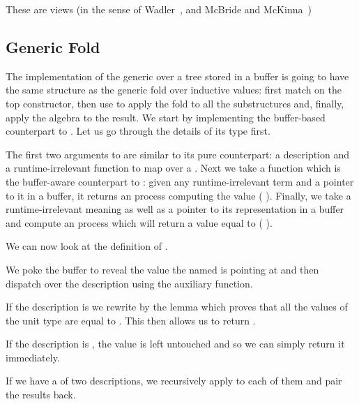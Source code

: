 These are views
(in the sense of Wadler~\cite{DBLP:conf/popl/Wadler87},
and McBride and McKinna~\cite{DBLP:journals/jfp/McBrideM04})


\subsection{Generic Fold}

The implementation of the generic  over a tree stored
in a buffer is going to have the same structure as the generic fold over
inductive values: first match on the top constructor, then use 
to apply the fold to all the substructures and, finally, apply the algebra to
the result.
%
We start by implementing the buffer-based counterpart to .
Let us go through the details of its type first.


The first two arguments to  are similar to its pure
counterpart: a description  and a runtime-irrelevant function
 to map over a .
%
Next we take a function which is the buffer-aware counterpart to :
given any runtime-irrelevant term  and a pointer to it in a buffer,
it returns an  process computing the value ( ).
%
Finally, we take a runtime-irrelevant meaning 
as well as a pointer to its representation in a buffer and compute
an  process which will return a value equal to
(   ).

We can now look at the definition of .


We poke the buffer to reveal the value the 
named  is pointing at and then dispatch over the description
 using the  auxiliary function.

If the description is  we rewrite by the lemma
 which proves that all the values of the unit type
are equal to \IdrisData{()}. This then allows us to return \IdrisData{()}.

If the description is , the value is left untouched and so
we can simply return it immediately.

If we have a  of two descriptions, we recursively apply
 to each of them and pair the results back.

